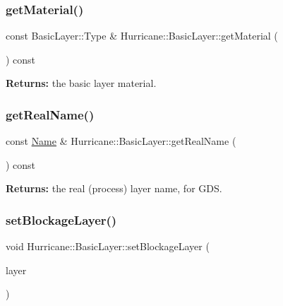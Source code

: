 \subsubsection{\texorpdfstring{get\+Material()}{getMaterial()}}
{\footnotesize\ttfamily const Basic\+Layer\+::\+Type \& Hurricane\+::\+Basic\+Layer\+::get\+Material (\begin{DoxyParamCaption}{ }\end{DoxyParamCaption}) const\hspace{0.3cm}{\ttfamily [inline]}}

{\bfseries Returns\+:} the basic layer material. \mbox{\label{classHurricane_1_1BasicLayer_aaae9fcd776eb83407b4566614eafc41f}} 
\subsubsection{\texorpdfstring{get\+Real\+Name()}{getRealName()}}
{\footnotesize\ttfamily const \hyperlink{classHurricane_1_1Name}{Name} \& Hurricane\+::\+Basic\+Layer\+::get\+Real\+Name (\begin{DoxyParamCaption}{ }\end{DoxyParamCaption}) const\hspace{0.3cm}{\ttfamily [inline]}}

{\bfseries Returns\+:} the real (process) layer name, for G\+DS. \mbox{\label{classHurricane_1_1BasicLayer_a766c6dc1120de2066b15411861f5d4f8}} 
\subsubsection{\texorpdfstring{set\+Blockage\+Layer()}{setBlockageLayer()}}
{\footnotesize\ttfamily void Hurricane\+::\+Basic\+Layer\+::set\+Blockage\+Layer (\begin{DoxyParamCaption}\item[{\hyperlink{classHurricane_1_1BasicLayer}{Basic\+Layer} $\ast$}]{layer }\end{DoxyParamCaption})\hspace{0.3cm}{\ttfamily [inline]}}

